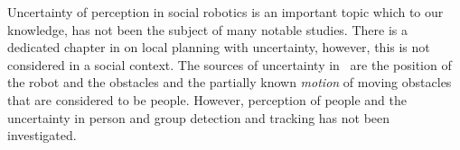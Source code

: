 Uncertainty of perception in social robotics is an important topic which to our knowledge, has not been the subject of many notable studies. There is a dedicated chapter in \cite{correa2014uncertainty} on local planning with uncertainty, however, this is not considered in a social context. The sources of uncertainty in~\cite{correa2014uncertainty} are the position of the robot and the obstacles and the partially known \emph{motion} of moving obstacles that are considered to be people. However, perception of people and the uncertainty in person and group detection and tracking has not been investigated.


